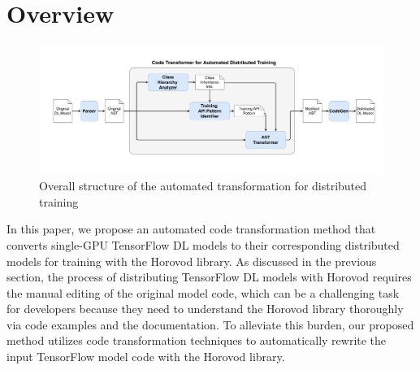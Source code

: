 \section{Overview}
 
\begin{figure}[ht!]
  \centering
  \includegraphics[width=\textwidth]{overview_diagram.pdf}
  \caption{Overall structure of the 
  automated transformation for distributed training}
  \label{sysarch}
\end{figure}


In this paper, we propose an automated code transformation method that converts
single-GPU TensorFlow DL models to their corresponding distributed models for
training with the Horovod library. 
As discussed in the previous section, the process of distributing TensorFlow DL
models with Horovod requires the manual editing of the original model code,
which can be a challenging task for developers because they need to understand
the Horovod library thoroughly via code examples and the documentation.
To alleviate this burden, our proposed method utilizes code transformation
techniques to automatically rewrite the input TensorFlow model code with the
Horovod library.


